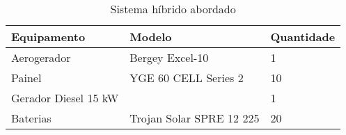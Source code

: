 
\begin{table}[ht]
	\centering
	\caption{Sistema híbrido abordado}\label{tbl:sistema}
    \begin{tabular}{l l l}
		\hline
        Equipamento  &  Modelo     & Quantidade    \\
		\hline
		\hline
        Aerogerador          & Bergey Excel-10          & 1               \\
        Painel               & YGE 60 CELL Series 2     & 10              \\
		Gerador Diesel 15 kW &                          & 1               \\
		Baterias             & Trojan Solar SPRE 12 225 & 20              \\
		\hline
	\end{tabular}
\end{table}

